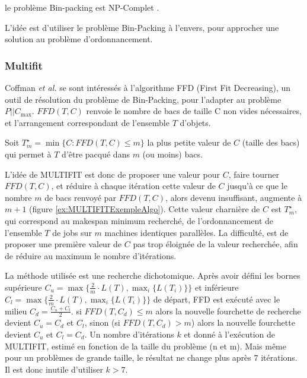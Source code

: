 \documentclass[a4paper,12pt]{report}
\theoremstyle{plain}				%
\theoremstyle{definition}				%
\newcommand\problemGrahamP{$P||C_{\max}$\xspace}
\newcommand{\tdi}[1]{\todo[inline]{{#1}}{}}
\newcommand{\lp}[1]{\todo[author=LP,color=yellow,inline]{#1}}
\begin{document}
le problème Bin-packing est NP-Complet \cite{Johnson1974WorstCasePB}.

L'idée est d'utiliser le problème Bin-Packing à l'envers, pour
approcher une solution au problème d'ordonnancement.


\subsubsection{Multifit}

Coffman \emph{et al.} \cite{coffman1978application} se sont
intéressés à l'algorithme FFD (First Fit Decreasing), un outil de
résolution du problème de Bin-Packing, pour l'adapter au problème
\problemGrahamP.
$FFD(T,C)$ renvoie le nombre de bacs de taille C non vides
nécessaires, et l'arrangement correspondant de l'ensemble $T$ d'objets.

\bigskip
Soit $T_m^\star = \min\{C:FFD(T,C) \leq m\}$ la plus petite valeur de
$C$ (taille des bacs) qui permet à $T$ d'être pacqué dans $m$ (ou moins)
bacs.

\bigskip


L'idée de MULTIFIT est donc de proposer une valeur pour $C$, faire
tourner $FFD(T,C) $, et réduire à chaque itération cette valeur de $C$
jusqu'à ce que le nombre $m$ de bacs renvoyé par $FFD(T,C) $, alors
devenu insuffisant, augmente à $m+1$ (figure \ref{ex:MULTIFITExempleAlgo}).
Cette valeur charnière de $C$ est $T_m^\star$, qui correspond au
makespan minimum recherché, de l'ordonnancement de l'ensemble $T$ de
jobs sur $m$ machines identiques parallèles.
La difficulté, est de proposer une première valeur de $C$ pas trop
éloignée de la valeur recherchée, afin de réduire au maximum le nombre
d'itérations.

La méthode utilisée est une recherche dichotomique.
Après avoir défini les bornes supérieure
$C_u = \max\{\frac{2}{m} \cdot L(T), \max_i\{L(T_i)\} \}$ et
inférieure $C_l = \max\{\frac{2}{m} \cdot L(T), \max_i\{L(T_i)\} \}$
de départ, FFD est exécuté avec le milieu $C_d = \frac{C_u + C_l}{2}$.
si $FFD(T,C_d)\le m$ alors la nouvelle fourchette de recherche devient
$C_u = C_d$ et $C_l$, sinon (si $FFD(T,C_d)> m$) alors la nouvelle
fourchette devient $C_u$ et $C_l = C_d$.
Un nombre d'itérations $k$ et donné à l'exécution de MULTIFIT, estimé
en fonction de la taille du problème (n et m).
Mais même pour un problèmes de grande taille, le résultat ne change
plus après $7$ itérations.
Il est donc inutile d'utiliser $k>7$.
\end{document}
